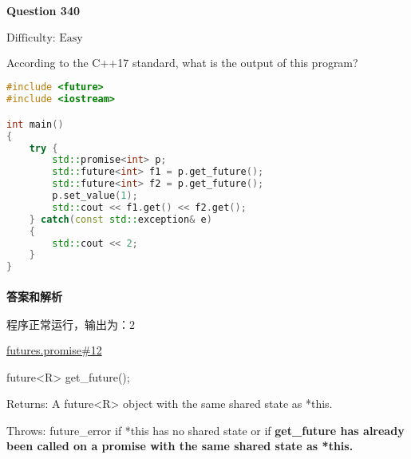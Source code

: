 \documentclass{article}
\begin{document}
	\paragraph*{Question 340} $\boxed{\text{Difficulty: Easy}} $			
	
	According to the C++17 standard, what is the output of this program?
	
	\begin{lstlisting}[language=C++]  		
#include <future>
#include <iostream>

int main()
{
	try {
		std::promise<int> p;
		std::future<int> f1 = p.get_future();
		std::future<int> f2 = p.get_future();
		p.set_value(1);
		std::cout << f1.get() << f2.get();
	} catch(const std::exception& e)
	{
		std::cout << 2;
	}
}
	\end{lstlisting}
	
	\paragraph*{答案和解析} $\boxed{\text{程序正常运行，输出为：2}} $
	
	\href{https://timsong-cpp.github.io/cppwp/n4659/futures.promise#12}{futures.promise\#12}
	\begin{lightgrayleftbar}
		future<R> get\_future();
		
		Returns: A future<R> object with the same shared state as *this.
		
		Throws: future\_­error if *this has no shared state or if 
	\textbf{get\_­future has already been called on a promise with the same shared state as *this.}
	\end{lightgrayleftbar}
\end{document}
